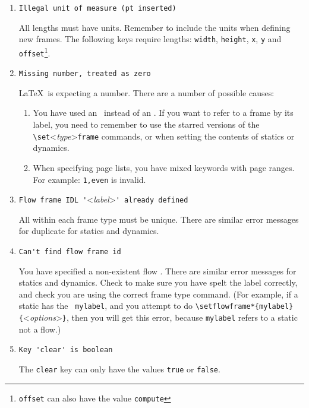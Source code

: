 \documentclass[a4paper,twoside]{book}
\newcommand{\meta}[1]{\textnormal{\textless\textit{#1}\textgreater}}
\newcounter{N}
\newcounter{I}
\begin{document}
\begin{enumerate}
\item \verb/Illegal unit of measure (pt inserted)/

All lengths must have units. Remember to include the
units when defining new \gls{frame}s. The following
keys require lengths: \texttt{width}, \texttt{height},
\texttt{x}, \texttt{y} and \texttt{offset}\footnote{%
\texttt{offset} can also have the value \texttt{compute}}.

\item \verb/Missing number, treated as zero/

\LaTeX\ is expecting a number. There are a number of 
possible causes:

\begin{enumerate}
\item You have used an \IDL\ instead of an \IDN. If you
want to refer to a frame by its label, you need to remember
to use the starred versions of the 
\verb/\set/\meta{type}\verb/frame/ commands, or when setting
the contents of \gls{static}s or \gls{dynamic}s.

\item When specifying page lists, you have mixed keywords
with page ranges. For example: \texttt{1,even} is invalid.
\end{enumerate}

\item \verb/Flow frame IDL '/\meta{label}\verb+' already defined+

All  within each \gls{frame} type must be
unique. There are similar error messages for duplicate 
 for \gls{static}s and \gls{dynamic}s.

\item \verb/Can't find flow frame id/

You have specified a non-existent \gls{flow} \IDL. There are
similar error messages for \gls{static}s and \gls{dynamic}s.
Check to make sure you have spelt the label correctly, and
check you are using the correct \gls{frame} type command.
(For example, if a \gls{static} has the \IDL\ \texttt{mylabel},
and you attempt to do 
\verb/\setflowframe*{mylabel}{/\meta{options}\verb/}/, 
then you will get this error, because \texttt{mylabel} refers
to a \gls{static} not a \gls{flow}.)

\item \verb/Key 'clear' is boolean/

The \texttt{clear} key can only have the values \texttt{true}
or \texttt{false}.


\end{enumerate}
\end{document}
